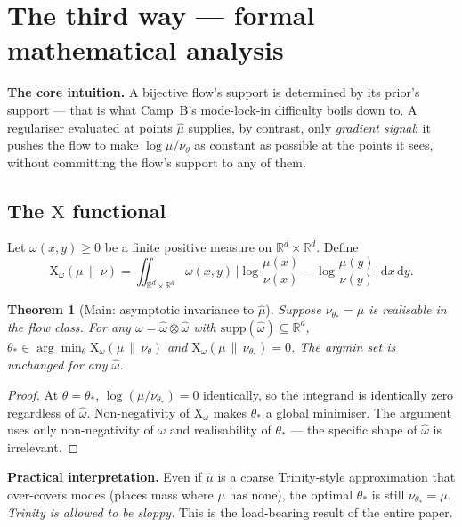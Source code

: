 \documentclass[11pt,letterpaper]{article}
\newcommand{\Real}{\mathbb{R}}
\newcommand{\Xfun}{\mathrm{X}}
\newcommand{\Ge}{\geqslant}
\newcommand{\dd}{\mathrm{d}}
\theoremstyle{plain}
\newtheorem{theorem}{Theorem}
\begin{document}
\section{The third way --- formal mathematical analysis}\label{sec:thirdway}

\begin{callout}
\textbf{The core intuition.} A bijective flow's support is determined by its
prior's support --- that is what Camp~B's mode-lock-in difficulty boils down to.
A regulariser evaluated at points $\hat\mu$ supplies, by contrast, only
\emph{gradient signal}: it pushes the flow to make $\log\mu/\nu_\theta$ as
constant as possible at the points it sees, without committing the flow's
support to any of them.
\end{callout}

\subsection{The $\Xfun$ functional}

Let $\omega(x,y)\Ge 0$ be a finite positive measure on $\Real^d\times\Real^d$.
Define
\begin{equation}\label{eq:Xdef}
  \Xfun_\omega(\mu\,\|\,\nu) = \iint_{\Real^d\times\Real^d} \omega(x,y)\,\Big|\log\frac{\mu(x)}{\nu(x)} - \log\frac{\mu(y)}{\nu(y)}\Big|\,\dd x\,\dd y.
\end{equation}

\begin{theorem}[Main: asymptotic invariance to $\hat\mu$]\label{prop:invariance}
Suppose $\nu_{\theta_*}=\mu$ is realisable in the flow class. For any
$\omega=\hat\omega\otimes\hat\omega$ with
$\mathrm{supp}(\hat\omega)\subseteq\Real^d$, $\theta_*\in\arg\min_\theta\Xfun_\omega(\mu\,\|\,\nu_\theta)$
and $\Xfun_\omega(\mu\,\|\,\nu_{\theta_*})=0$. The argmin set is unchanged for any
$\hat\omega$.
\end{theorem}

\begin{proof}
At $\theta=\theta_*$, $\log(\mu/\nu_{\theta_*})=0$ identically, so the integrand
is identically zero regardless of $\hat\omega$. Non-negativity of $\Xfun_\omega$
makes $\theta_*$ a global minimiser. The argument uses only non-negativity of
$\omega$ and realisability of $\theta_*$ --- the specific shape of $\hat\omega$
is irrelevant.
\end{proof}

\noindent\textbf{Practical interpretation.} Even if $\hat\mu$ is a coarse
Trinity-style approximation that over-covers modes (places mass where $\mu$
has none), the optimal $\theta_*$ is still $\nu_{\theta_*}=\mu$. \emph{Trinity
is allowed to be sloppy.} This is the load-bearing result of the entire paper.
\end{document}
